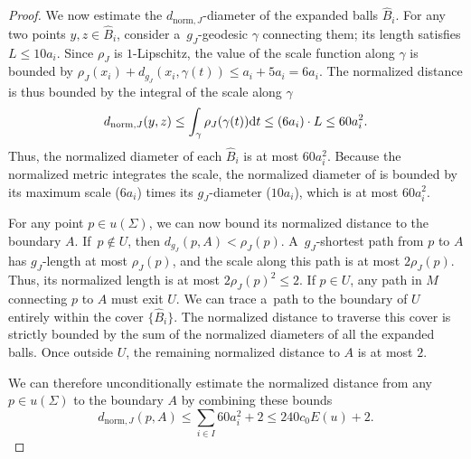 \documentclass[pdftex]{sigma}
\numberwithin{equation}{section}
\theoremstyle{definition}
\begin{document}
\begin{proof}
 We now estimate the $d_{\mathrm{norm},J}$-diameter of the expanded balls $\widehat{B}_i$. For any two points $y, z \in \widehat{B}_i$, consider a~$g_J$-geodesic $\gamma$ connecting them; its length satisfies $L \le 10a_i$. Since $\rho_J$ is $1$-Lipschitz, the value of the scale function along $\gamma$ is bounded by $\rho_J(x_i) + d_{g_J}(x_i, \gamma(t)) \le a_i + 5a_i = 6a_i$. The normalized distance is thus bounded by the integral of the scale along $\gamma$
 \[
 d_{\mathrm{norm},J}(y, z) \le \int_\gamma \rho_J(\gamma(t)) {\rm d}t \le (6a_i) \cdot L \le 60 a_i^2.
 \]
 Thus, the normalized diameter of each $\widehat{B}_i$ is at most $60a_i^2$.
 Because the normalized metric integrates the scale, the normalized diameter of  is bounded by its maximum scale ($6a_i$) times its $g_J$-diameter ($10a_i$), which is at most $60a_i^2$.

 For any point $p \in u(\Sigma)$, we can now bound its normalized distance to the boundary $A$.
 If~${p \notin U}$, then $d_{g_J}(p, A) < \rho_J(p)$. A~$g_J$-shortest path from $p$ to $A$ has $g_J$-length at most $\rho_J(p)$, and the scale along this path is at most $2\rho_J(p)$. Thus, its normalized length is at most $2\rho_J(p)^2 \le 2$.
 If $p \in U$, any path in $M$ connecting $p$ to $A$ must exit $U$. We can trace a~path to the boundary of $U$ entirely within the cover $\big\{\widehat{B}_i\big\}$. The normalized distance to traverse this cover is strictly bounded by the sum of the normalized diameters of all the expanded balls. Once outside $U$, the remaining normalized distance to $A$ is at most $2$.

 We can therefore unconditionally estimate the normalized distance from any $p \in u(\Sigma)$ to the boundary $A$ by combining these bounds
 \[%
 d_{\mathrm{norm},J}(p,A) \le \sum_{i \in I} 60a_i^2 + 2 \le 240 c_0 E(u) + 2.\tag*{\qed}
 \] \renewcommand{\qed}{}
\end{proof}
\end{document}
